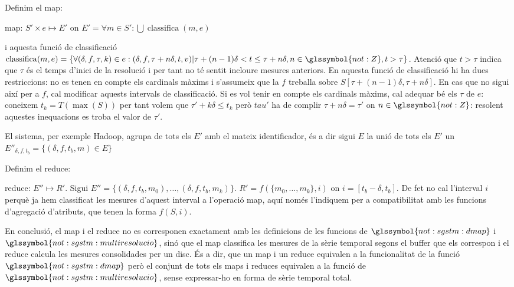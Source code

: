 Definim el map:

map: $S' \times e \mapsto E'$ on $E'= \forall m \in S':
\bigcup\operatorname{classifica}(m,e)$

i aquesta funció de classificació $\operatorname{classifica}(m,e)=\{
\forall (\delta,f,\tau,k) \in e: (\delta,f,\tau+n\delta,t,v) |
\tau+(n-1)\delta < t \leq \tau+n\delta, n\in\glssymbol{not:Z}, t >
\tau \}$.  Atenció que $t > \tau$ indica que $\tau$ és el temps
d'inici de la resolució i per tant no té sentit incloure mesures
anteriors. En aquesta funció de classificació hi ha dues restriccions:
no es tenen en compte els cardinals màxims i s'assumeix que la $f$
treballa sobre $S[\tau+(n-1)\delta ,\tau+n\delta]$. En cas que no
sigui així per a $f$, cal modificar aquests intervals de
classificació. Si es vol tenir en compte els cardinals màxims, cal
adequar bé els $\tau$ de $e$: coneixem $t_k=T(\max(S))$ per tant volem
que $\tau'+k\delta \leq t_k$ però $tau'$ ha de complir
$\tau+n\delta=\tau'$ on $n\in\glssymbol{not:Z}$: resolent aquestes
inequacions es troba el valor de $\tau'$.






El sistema, per exemple Hadoop, agrupa de tots els $E'$ amb el
mateix identificador, és a dir sigui $E$ la unió de tots els $E'$ un
 $E''_{\delta,f,t_b} = \{ (\delta,f,t_b,m) \in E \}$



Definim el reduce:

reduce: $E'' \mapsto R'$. Sigui $E''= \{ (\delta,f,t_b,m_0) ,\dotsc,
(\delta,f,t_b,m_k) \}$. $R'=f(\{m_0,\dotsc,m_k\},i)$ on
$i=[t_b-\delta,t_b]$. De fet no cal l'interval $i$ perquè ja hem
classificat les mesures d'aquest interval a l'operació map, aquí només
l'indiquem per a compatibilitat amb les funcions d'agregació
d'atributs, que tenen la forma $f(S,i)$.




\todo{} En conclusió, el map i el reduce no es corresponen exactament
amb les definicions de les funcions de $\glssymbol{not:sgstm:dmap}$ i
$\glssymbol{not:sgstm:multiresolucio}$, sinó que el map classifica les
mesures de la sèrie temporal segons el buffer que els correspon i el
reduce calcula les mesures consolidades per un disc. És a dir, que un
map i un reduce equivalen a la funcionalitat de la funció
$\glssymbol{not:sgstm:dmap}$ però el conjunt de tots els maps i
reduces equivalen a la funció de
$\glssymbol{not:sgstm:multiresolucio}$, sense expressar-ho en forma de
sèrie temporal total.



